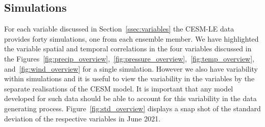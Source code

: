 \subsection{Simulations}
For each variable discussed in Section~\ref{ssec:variables} the CESM-LE data provides forty simulations, one from each ensemble member.
We have highlighted the variable spatial and temporal correlations in the four variables discussed in the Figures~\ref{fig:precip_overview},~\ref{fig:pressure_overview},~\ref{fig:temp_overview}, and~\ref{fig:wind_overview} for a single simulation.
However we also have variability within simulations and it is useful to view the variability in the variables by the separate realisations of the CESM model.
It is important that any model developed for such data should be able to account for this variability in the data generating process.
Figure~\ref{fig:std_overview} displays a snap shot of the standard deviation of the respective variables in June 2021.

